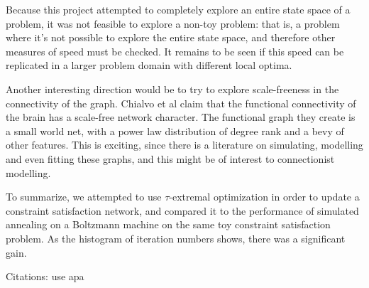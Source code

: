 \documentclass[12pt]{article}
\begin{document}
Because this project attempted to completely explore an entire state space of a problem, it was not feasible to explore a non-toy problem: that is, a problem where it's not possible to explore the entire state space, and therefore other measures of speed must be checked. It remains to be seen if this speed can be replicated in a larger problem domain with different local optima.

Another interesting direction would be to try to explore scale-freeness in the connectivity of the graph. Chialvo et al claim that the functional connectivity of the brain has a scale-free network character. The functional graph they create is a small world net, with a power law distribution of degree rank and a bevy of other features. This is exciting, since there is a literature on simulating, modelling and even fitting these graphs, and this might be of interest to connectionist modelling.

To summarize, we attempted to use $\tau$-extremal optimization in order to update a constraint satisfaction network, and compared it to the performance of simulated annealing on a Boltzmann machine on the same toy constraint satisfaction problem. As the histogram of iteration numbers shows, there was a significant gain.

\begin{thebibliography}[99]
    Citations:   use apa
\end{thebibliography}
\end{document}
